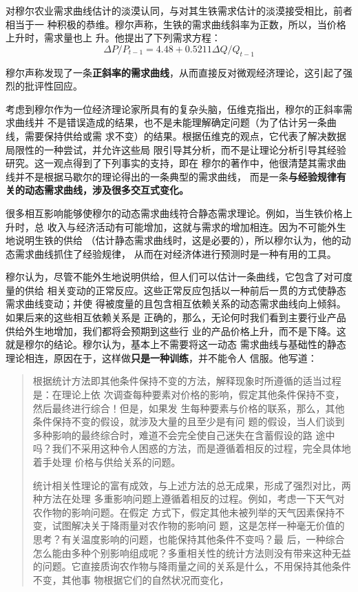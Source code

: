 对穆尔农业需求曲线估计的淡漠认同，与对其生铁需求估计的淡漠接受相比，前者相当于一
种积极的恭维。穆尔声称，生铁的需求曲线斜率为正数，所以，当价格上升时，需求量也上
升。他提出了下列需求方程：
\[\Delta P/P_{t-1}=4.48+0.5211 \Delta Q/Q_{t-1}\]

穆尔声称发现了一条\textbf{正斜率的需求曲线}，从而直接反对微观经济理论，这引起了强
烈的批评性回应。

考虑到穆尔作为一位经济理论家所具有的复杂头脑，伍维克指出，穆尔的正斜率需求曲线并
不是错误造成的结果，也不是未能理解确定问题（为了估计另一条曲线，需要保持供给或需
求不变）的结果。根据伍维克的观点，它代表了解决数据局限性的一种尝试，并允许这些局
限引导其分析，而不是让理论分析引导其经验研究。这一观点得到了下列事实的支持，即在
穆尔的著作中，他很清楚其需求曲线并不是根据马歇尔的理论得出的一条典型的需求曲线，
而是一条\textbf{与经验规律有关的动态需求曲线，涉及很多交互式变化。}

很多相互影响能够使穆尔的动态需求曲线符合静态需求理论。例如，当生铁价格上升时，总
收入与经济活动有可能增加，这就与需求的增加相连。因为不可能外生地说明生铁的供给
（估计静态需求曲线时，这是必要的），所以穆尔认为，他的动态需求曲线抓住了经验规律，
从而在对经济体进行预测时是一种有用的工具。

穆尔认为，尽管不能外生地说明供给，但人们可以估计一条曲线，它包含了对可度量的供给
相关变动的正常反应。这些正常反应包括以一种前后一贯的方式使静态需求曲线变动；并使
得被度量的且包含相互依赖关系的动态需求曲线向上倾斜。如果后来的这些相互依赖关系是
正确的，那么，无论何时我们看到主要行业产品供给外生地增加，我们都将会预期到这些行
业的产品价格上升，而不是下降。这就是穆尔的结论。穆尔认为，基本上不需要将这一动态
需求曲线与基础性的静态理论相连，原因在于，这样做\textbf{只是一种训练}，并不能令人
信服。他写道：

\begin{quotation}
  根据统计方法即其他条件保持不变的方法，解释现象时所遵循的适当过程是：在理论上依
  次调查每种要素对价格的影响，假定其他条件保持不变，然后最终进行综合！但是，如果发
  生每种要素与价格的联系，那么，其他条件保持不变的假设，就涉及大量的且至少是有问
  题的假设，当人们谈到多种影响的最终综合时，难道不会完全使自己迷失在含蓄假设的路
  途中吗？我们不采用这种令人困惑的方法，而是遵循着相反的过程，完全具体地着手处理
  价格与供给关系的问题。

  统计相关性理论的富有成效，与上述方法的总无成果，形成了强烈对比，两种方法在处理
  多重影响问题上遵循着相反的过程。例如，考虑一下天气对农作物的影响问题。在假定
  方式下，假定其他未被列举的天气因素保持不变，试图解决关于降雨量对农作物的影响问
  题，这是怎样一种毫无价值的思考？有关温度影响的问题，也能保持其他条件不变吗？最
  后，一种综合怎么能由多种个别影响组成呢？多重相关性的统计方法则没有带来这种无益
  的问题。它直接质询农作物与降雨量之间的关系是什么，不用保持其他条件不变，其他事
  物根据它们的自然状况而变化，
\end{quotation}


